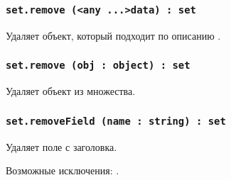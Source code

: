 \subsubsection{\lstinline|set.remove (<any ...>data) : set|}

Удаляет объект, который подходит по описанию .

\subsubsection{\lstinline|set.remove (obj : object) : set|}

Удаляет объект  из множества.

\subsubsection{\lstinline|set.removeField (name : string) : set|}

Удаляет поле  с заголовка.

Возможные исключения: .


